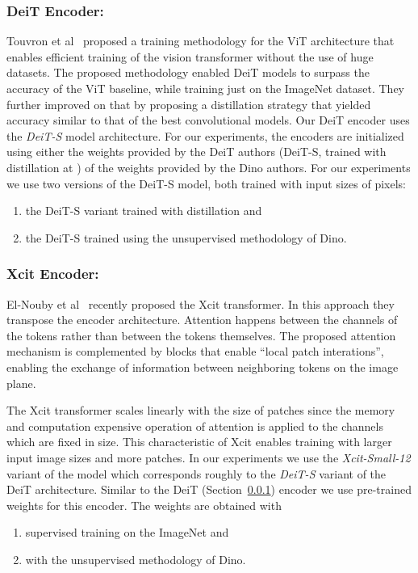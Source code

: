 \documentclass[runningheads]{llncs}
\begin{document}
\subsubsection{DeiT Encoder:}
\label{sec:deit}
Touvron et al~\cite{touvron2021training} proposed a training methodology for the ViT architecture 
that enables efficient training of the vision transformer without the use of huge datasets.
The proposed methodology enabled DeiT models to surpass the accuracy of the 
ViT baseline, while training just on the ImageNet dataset.
They further improved on that by proposing a distillation strategy that yielded accuracy 
similar to that of the best convolutional models.
Our DeiT encoder uses the \emph{DeiT-S} model architecture. For our experiments, the encoders are initialized using either the weights provided by the DeiT authors (DeiT-S, trained with distillation at ) of the weights provided by the Dino authors.
For our experiments we use two versions of the DeiT-S model, both trained with 
input sizes of  pixels:
\begin{enumerate}
\item
the DeiT-S variant trained with distillation and
\item
the DeiT-S trained using the unsupervised methodology of Dino.
\end{enumerate}

\subsubsection{Xcit Encoder:}
El-Nouby et al~\cite{el2021xcit} recently proposed the Xcit transformer. 
In this approach they transpose the encoder architecture. 
Attention happens between the channels of the tokens rather than between
the tokens themselves. The proposed attention mechanism is complemented by 
blocks that enable ``local patch interations'', enabling the exchange of information 
between neighboring tokens on the image plane.

The Xcit transformer scales linearly with the size of patches since the 
memory and computation expensive operation of attention is applied to the channels 
which are fixed in size. This characteristic of Xcit enables training with larger input image sizes and more patches. In our experiments we use the \emph{Xcit-Small-12} variant of the model
which corresponds roughly to the \emph{DeiT-S} variant of the DeiT architecture.
Similar to the DeiT (Section~\ref{sec:deit}) encoder we use pre-trained weights for this 
encoder. The weights are obtained with 
\begin{enumerate}
\item
supervised training on the ImageNet and 
\item
with the unsupervised methodology of Dino.
\end{enumerate}
\end{document}
